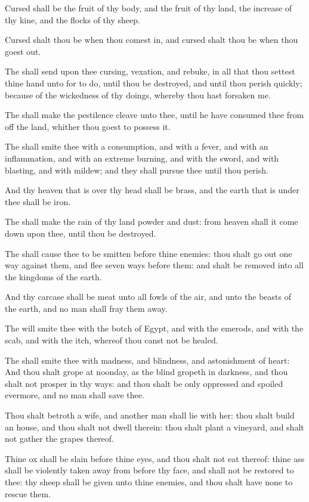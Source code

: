 \verse Cursed shall be the fruit of thy body, and the fruit of thy land, the increase of thy kine, and the flocks of thy sheep.

\verse Cursed shalt thou be when thou comest in, and cursed shalt thou be when thou goest out.

\verse The \LORD shall send upon thee cursing, vexation, and rebuke, in all that thou settest thine hand unto for to do, until thou be destroyed, and until thou perish quickly; because of the wickedness of thy doings, whereby thou hast forsaken me.

\verse The \LORD shall make the pestilence cleave unto thee, until he have consumed thee from off the land, whither thou goest to possess it.

\verse The \LORD shall smite thee with a consumption, and with a fever, and with an inflammation, and with an extreme burning, and with the sword, and with blasting, and with mildew; and they shall pursue thee until thou perish.

\verse And thy heaven that is over thy head shall be brass, and the earth that is under thee shall be iron.

\verse The \LORD shall make the rain of thy land powder and dust: from heaven shall it come down upon thee, until thou be destroyed.

\verse The \LORD shall cause thee to be smitten before thine enemies: thou shalt go out one way against them, and flee seven ways before them: and shalt be removed into all the kingdoms of the earth.

\verse And thy carcase shall be meat unto all fowls of the air, and unto the beasts of the earth, and no man shall fray them away.

\verse The \LORD will smite thee with the botch of Egypt, and with the emerods, and with the scab, and with the itch, whereof thou canst not be healed.

\verse The \LORD shall smite thee with madness, and blindness, and astonishment of heart: \verse And thou shalt grope at noonday, as the blind gropeth in darkness, and thou shalt not prosper in thy ways: and thou shalt be only oppressed and spoiled evermore, and no man shall save thee.

\verse Thou shalt betroth a wife, and another man shall lie with her: thou shalt build an house, and thou shalt not dwell therein: thou shalt plant a vineyard, and shalt not gather the grapes thereof.

\verse Thine ox shall be slain before thine eyes, and thou shalt not eat thereof: thine ass shall be violently taken away from before thy face, and shall not be restored to thee: thy sheep shall be given unto thine enemies, and thou shalt have none to rescue them.

